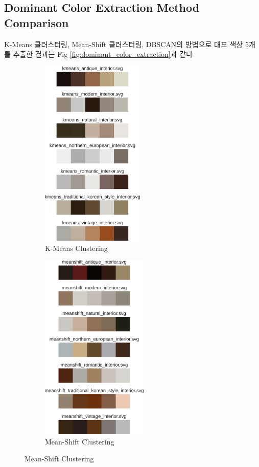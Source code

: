 \documentclass[11pt]{article}
\begin{document}
\subsection{Dominant Color Extraction Method Comparison}
K-Means 클러스터링, Mean-Shift 클러스터링, DBSCAN의 방법으로 대표 색상 5개를 추출한 결과는 Fig \ref{fig:dominant_color_extraction}과 같다
\begin{figure}[htbp]
    \centering
    \begin{subfigure}[b]{0.3\textwidth}
        \centering
        \includegraphics[height=9cm]{figures/kmeans_dominant_color.pdf}
        \caption{K-Means Clustering}
        \label{fig:kmeans}
    \end{subfigure}
    \begin{subfigure}[b]{0.3\textwidth}
        \centering
        \includegraphics[height=9cm]{figures/meanshift_dominant_color.pdf}
        \caption{Mean-Shift Clustering}

\end{subfigure}
\end{figure}
\end{document}
